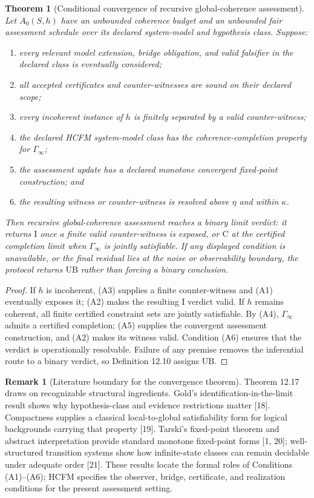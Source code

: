 \documentclass[11pt]{article}
\newtheorem{theorem}{Theorem}
\theoremstyle{definition}
\newtheorem{remark}{Remark}
\begin{document}
\begin{theorem}[Conditional convergence of recursive global-coherence assessment]
Let $A_0(S, h)$ have an unbounded coherence budget and an unbounded fair assessment schedule over its declared system-model and hypothesis class. Suppose:
\begin{enumerate}[label=(A\arabic*)]
\item[(A1)] every relevant model extension, bridge obligation, and valid falsifier in the declared class is eventually considered;
\item[(A2)] all accepted certificates and counter-witnesses are sound on their declared scope;
\item[(A3)] every incoherent instance of $h$ is finitely separated by a valid counter-witness;
\item[(A4)] the declared HCFM system-model class has the coherence-completion property for $\Gamma_\infty$;
\item[(A5)] the assessment update has a declared monotone convergent fixed-point construction; and
\item[(A6)] the resulting witness or counter-witness is resolved above $\eta$ and within $\kappa$.
\end{enumerate}
Then recursive global-coherence assessment reaches a binary limit verdict: it returns $\mathrm{I}$ once a finite valid counter-witness is exposed, or $\mathrm{C}$ at the certified completion limit when $\Gamma_\infty$ is jointly satisfiable. If any displayed condition is unavailable, or the final residual lies at the noise or observability boundary, the protocol returns $\mathrm{UB}$ rather than forcing a binary conclusion.
\end{theorem}

\begin{proof}
If $h$ is incoherent, (A3) supplies a finite counter-witness and (A1) eventually exposes it; (A2) makes the resulting $\mathrm{I}$ verdict valid. If $h$ remains coherent, all finite certified constraint sets are jointly satisfiable. By (A4), $\Gamma_\infty$ admits a certified completion; (A5) supplies the convergent assessment construction, and (A2) makes its witness valid. Condition (A6) ensures that the verdict is operationally resolvable. Failure of any premise removes the inferential route to a binary verdict, so Definition 12.10 assigns $\mathrm{UB}$.
\end{proof}

\begin{remark}[Literature boundary for the convergence theorem]
Theorem 12.17 draws on recognizable structural ingredients. Gold's identification-in-the-limit result shows why hypothesis-class and evidence restrictions matter [18]. Compactness supplies a classical local-to-global satisfiability form for logical backgrounds carrying that property [19]. Tarski's fixed-point theorem and abstract interpretation provide standard monotone fixed-point forms [1, 20]; well-structured transition systems show how infinite-state classes can remain decidable under adequate order [21]. These results locate the formal roles of Conditions (A1)--(A6); HCFM specifies the observer, bridge, certificate, and realization conditions for the present assessment setting.
\end{remark}
\end{document}
